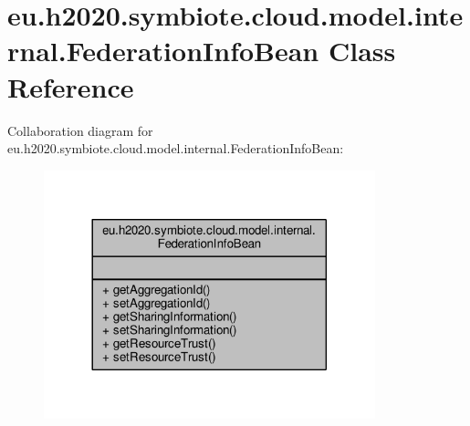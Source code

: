 \hypertarget{classeu_1_1h2020_1_1symbiote_1_1cloud_1_1model_1_1internal_1_1FederationInfoBean}{}\section{eu.\+h2020.\+symbiote.\+cloud.\+model.\+internal.\+Federation\+Info\+Bean Class Reference}
\label{classeu_1_1h2020_1_1symbiote_1_1cloud_1_1model_1_1internal_1_1FederationInfoBean}


Collaboration diagram for eu.\+h2020.\+symbiote.\+cloud.\+model.\+internal.\+Federation\+Info\+Bean\+:
\nopagebreak
\begin{figure}[H]
\begin{center}
\leavevmode
\includegraphics[width=272pt]{classeu_1_1h2020_1_1symbiote_1_1cloud_1_1model_1_1internal_1_1FederationInfoBean__coll__graph}
\end{center}
\end{figure}
